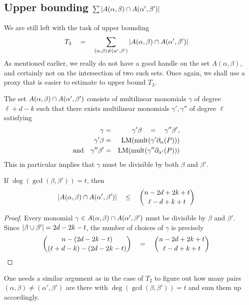 \subsection*{Upper bounding $\sum \left|A(\alpha,\beta)\cap A(\alpha',\beta')\right|$}

We are still left with the task of upper bounding
\[
T_3 \quad = \quad \sum_{(\alpha, \beta)\neq (\alpha',\beta')} \left|A(\alpha, \beta) \cap A(\alpha',\beta')\right|
\]
As mentioned earlier, we really do not have a good handle on the set $A(\alpha, \beta)$, and certainly not on the intersection of two such sets. 
Once again, we shall use a proxy that is easier to estimate to upper bound $T_3$. 

The set $A(\alpha, \beta) \cap A(\alpha',\beta')$ consists of multilinear monomials $\gamma$ of degree $\ell + d -k$ such that there exists multilinear monomials $\gamma', \gamma''$ of degree $\ell$ satisfying
\begin{eqnarray*}
\gamma & = & \gamma' \beta \quad = \quad \gamma'' \beta',\\
 \gamma'\beta & = & \mathrm{LM}(\mathrm{mult}(\gamma' \partial_\alpha(P)))\\
\text{and}\quad \gamma''\beta' & = & \mathrm{LM}(\mathrm{mult}(\gamma'' \partial_{\alpha'}(P)))
\end{eqnarray*}
This in particular implies that $\gamma$ must be divisible by both $\beta$ and $\beta'$. 

\begin{observation}\label{obs:T3-proxy}
If $\deg(\gcd(\beta, \beta')) = t$, then
\[
\left|A(\alpha, \beta) \cap A(\alpha', \beta')\right| \quad \leq \quad \binom{n - 2d + 2k + t}{\ell - d + k +t}
\]
\end{observation}
\begin{proof}
Every monomial $\gamma \in A(\alpha, \beta) \cap A(\alpha', \beta')$ must be divisible by $\beta$ and $\beta'$. 
Since $\left|\beta \cup \beta'\right| = 2d - 2k - t$, the number of choices of $\gamma$ is precisely
\[
\binom{n - (2d - 2k -t)}{(\ell + d - k) - (2d - 2k - t)} \quad = \quad \binom{n - 2d + 2k + t}{\ell - d + k + t}\qedhere
\]
\end{proof}

One needs a similar argument as in the case of $T_2$ to figure out how many pairs $(\alpha, \beta) \neq (\alpha',\beta')$ are there with $\deg(\gcd(\beta, \beta')) = t$ and sum them up accordingly. 

